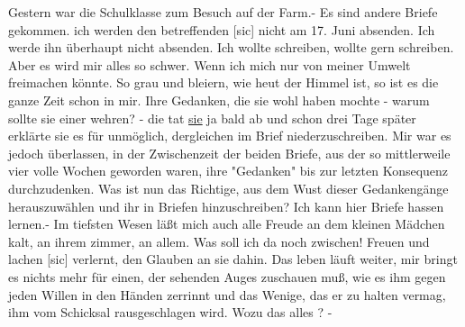 \def\day{16. Juni 1944.}
\mktitle
Gestern war die Schulklasse zum Besuch auf der Farm.-
Es sind andere Briefe gekommen.
ich werden den betreffenden{\color{red} [sic] } nicht am 17. Juni absenden.
Ich werde ihn \"{u}berhaupt nicht absenden.
Ich wollte schreiben, wollte gern schreiben.
Aber es wird mir alles so schwer.
Wenn ich mich nur von meiner Umwelt freimachen k\"{o}nnte.
So grau und bleiern, wie heut der Himmel ist, so ist es die ganze Zeit schon in mir.
Ihre Gedanken, die sie wohl haben mochte - warum sollte sie einer wehren? - die tat \ul{sie} ja bald ab und schon drei Tage sp\"{a}ter erkl\"{a}rte sie es f\"{u}r unm\"{o}glich, dergleichen im Brief niederzuschreiben.
Mir war es jedoch \"{u}berlassen, in der Zwischenzeit der beiden Briefe, aus der so mittlerweile vier volle Wochen geworden waren, ihre "Gedanken" bis zur letzten Konsequenz durchzudenken.
Was ist nun das Richtige, aus dem Wust dieser Gedankeng\"{a}nge herauszuw\"{a}hlen und ihr in Briefen hinzuschreiben?
Ich kann hier Briefe hassen lernen.-
Im tiefsten Wesen l\"{a}{\ss}t mich auch alle Freude an dem kleinen M\"{a}dchen kalt, an ihrem zimmer, an allem.
Was soll ich da noch zwischen!
Freuen und lachen{\color{red} [sic] } verlernt, den Glauben an sie dahin.
Das leben l\"{a}uft weiter, mir bringt es nichts mehr f\"{u}r einen, der sehenden Auges zuschauen mu{\ss}, wie es ihm gegen jeden Willen in den H\"{a}nden zerrinnt und das Wenige, das er zu halten vermag, ihm vom Schicksal rausgeschlagen wird.
Wozu das alles ? -

\clearpage
